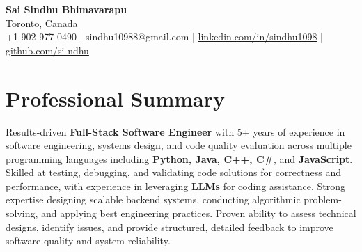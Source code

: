 \documentclass[letterpaper,11pt]{article}
\begin{document}
\begin{center}
  {\Large \textbf{Sai Sindhu Bhimavarapu}} \\
  Toronto, Canada \\
  +1-902-977-0490 \enspace | \enspace sindhu10988@gmail.com \enspace | \enspace \href{https://www.linkedin.com/in/sindhu1098/}{linkedin.com/in/sindhu1098} \enspace | \enspace \href{https://github.com/si-ndhu}{github.com/si-ndhu}
\end{center}

\section{Professional Summary}
  \begin{itemize}[leftmargin=0.15in, label={}]
    \small{\item{
     Results-driven \textbf{Full-Stack Software Engineer} with 5+ years of experience in software engineering, systems design, and code quality evaluation across multiple programming languages including \textbf{Python, Java, C++, C\#}, and \textbf{JavaScript}. Skilled at testing, debugging, and validating code solutions for correctness and performance, with experience in leveraging \textbf{LLMs} for coding assistance. Strong expertise designing scalable backend systems, conducting algorithmic problem-solving, and applying best engineering practices. Proven ability to assess technical designs, identify issues, and provide structured, detailed feedback to improve software quality and system reliability.
    }}
  \end{itemize}
\vspace{-16pt}

\end{document}
